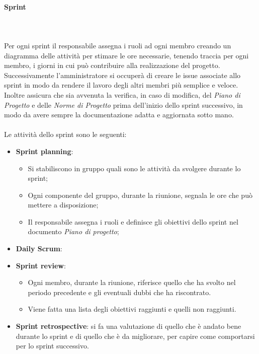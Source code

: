             \paragraph*{Sprint} ~\\\\
            Per ogni sprint il responsabile assegna i ruoli ad ogni membro creando un diagramma delle attività per stimare le ore necessarie, tenendo traccia per ogni membro, i giorni
            in cui può contribuire alla realizzazione del progetto.
            Successivamente l'amministratore si occuperà di creare le issue associate allo sprint in modo da rendere il lavoro degli altri membri più semplice e veloce.
            Inoltre assicura che sia avvenuta la verifica, in caso di modifica, del \textit{Piano
            di Progetto} e delle \textit{Norme di Progetto} prima dell'inizio dello sprint successivo, in modo da avere sempre la
            documentazione adatta e aggiornata sotto mano.\\\\
            Le attività dello sprint sono le seguenti:
            \begin{itemize}
                \item \textbf{Sprint planning}:
                \begin{itemize}
                    \item Si stabiliscono in gruppo quali sono le attività da svolgere durante lo sprint;
                    \item Ogni componente del gruppo, durante la riunione, segnala le ore che può mettere a disposizione;
                    \item Il responsabile assegna i ruoli e definisce gli obiettivi dello sprint nel documento \textit{Piano di progetto};
                \end{itemize}
                \item \textbf{Daily Scrum}:
                \item \textbf{Sprint review}:
                \begin{itemize}
                    \item Ogni membro, durante la riunione, riferisce quello che ha svolto nel periodo precedente e gli eventuali dubbi che ha riscontrato.
                    \item Viene fatta una lista degli obiettivi raggiunti e quelli non raggiunti.
                \end{itemize}
                \item \textbf{Sprint retrospective}: si fa una valutazione di quello che è andato bene durante lo sprint e di
                quello che è da migliorare, per capire come comportarsi per lo sprint successivo.
            \end{itemize}

